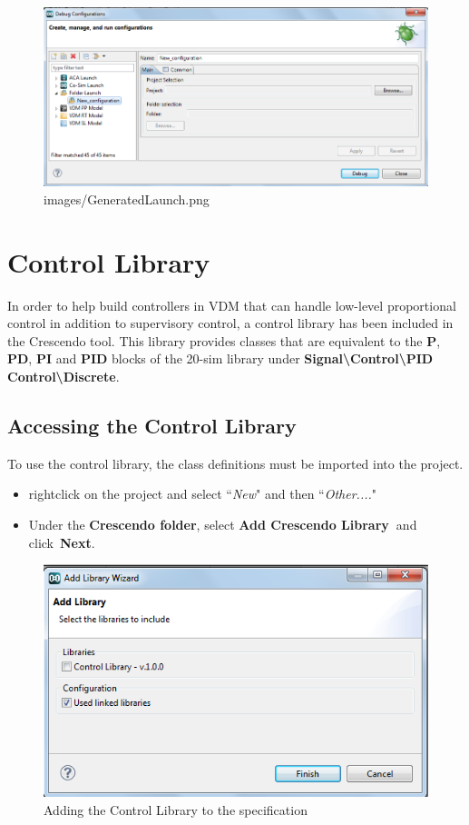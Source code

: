 \documentclass{crescendorepchap}
\begin{document}

\begin{figure}[htbp]
\centering
\includegraphics[width=.6\textwidth]{images/GeneratedLaunch.png}
\caption{images/GeneratedLaunch.png}
\end{figure}

\section{Control Library}

In order to help build controllers in VDM that can handle low-level
proportional control in addition to supervisory control, a control
library has been included in the Crescendo tool. This library provides
classes that are equivalent to the \textbf{P}, \textbf{PD}, \textbf{PI}
and \textbf{PID} blocks of the 20-sim library under
\textbf{Signal\textbackslash{}Control\textbackslash{}PID
Control\textbackslash{}Discrete}.

\subsection{Accessing the Control Library}

To use the control library, the class definitions must be imported into
the project.

\begin{itemize}
\item
  rightclick on the project and select ``\emph{New}" and then ``\emph{Other....}"
\item
  Under the \textbf{Crescendo folder}, select \textbf{Add Crescendo
  Library~}and click~\textbf{Next}.
\end{itemize}

\begin{figure}[htbp]
\centering
\includegraphics[width=.6\textwidth]{images/DestecsAddNewLibrary.png}
\caption{Adding the Control Library to the specification}
\end{figure}
\end{document}
